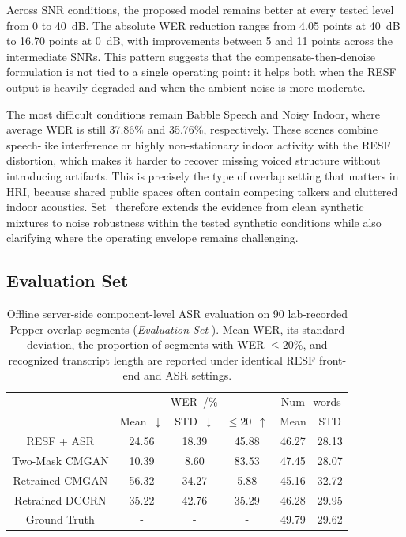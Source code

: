 \documentclass[manuscript,screen,review]{acmart}
\newcommand{\RomanNumeralCaps}[1]
    {\MakeUppercase{\romannumeral #1}}
\begin{document}
Across SNR conditions, the proposed model remains better at every tested level from 0 to 40~dB. The absolute WER reduction ranges from 4.05 points at 40~dB to 16.70 points at 0~dB, with improvements between 5 and 11 points across the intermediate SNRs. This pattern suggests that the compensate-then-denoise formulation is not tied to a single operating point: it helps both when the RESF output is heavily degraded and when the ambient noise is more moderate.

The most difficult conditions remain Babble Speech and Noisy Indoor, where average WER is still 37.86\% and 35.76\%, respectively. These scenes combine speech-like interference or highly non-stationary indoor activity with the RESF distortion, which makes it harder to recover missing voiced structure without introducing artifacts. This is precisely the type of overlap setting that matters in HRI, because shared public spaces often contain competing talkers and cluttered indoor acoustics. Set~\RomanNumeralCaps{2} therefore extends the evidence from clean synthetic mixtures to noise robustness within the tested synthetic conditions while also clarifying where the operating envelope remains challenging.

\subsection{Evaluation Set~\RomanNumeralCaps{3}}
\begin{table}[ht]
    \centering
    \caption{Offline server-side component-level ASR evaluation on 90 lab-recorded Pepper overlap segments (\textit{Evaluation Set \RomanNumeralCaps{3}}). Mean WER, its standard deviation, the proportion of segments with WER $\leq 20\%$, and recognized transcript length are reported under identical RESF front-end and ASR settings.}
    \begin{tabular}{cccccc}
    \hline
        & \multicolumn{3}{c}{WER~/\%} & \multicolumn{2}{c}{Num\_words}\\
        & Mean~$\downarrow$       & STD~$\downarrow$   & $\leq 20$~$\uparrow$     & Mean          & STD            \\ \hline
RESF + ASR  & 24.56    & 18.39  & 45.88 & 46.27           & 28.13         \\
Two-Mask CMGAN & 10.39    & 8.60   & 83.53 & 47.45           & 28.07         \\ 
Retrained CMGAN & 56.32    & 34.27 & 5.88 &     45.16         &     32.72            \\
Retrained DCCRN &35.22   & 42.76   & 35.29  & 46.28             &  29.95               \\
Ground Truth & - &- &- & 49.79 & 29.62 \\
\hline
    \end{tabular}
    \label{tab:2}
\end{table}
\end{document}
